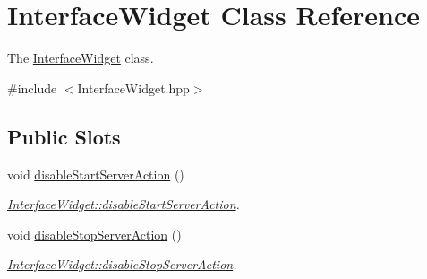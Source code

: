 \hypertarget{class_interface_widget}{\section{\-Interface\-Widget \-Class \-Reference}
\label{class_interface_widget}
}


\-The \hyperlink{class_interface_widget}{\-Interface\-Widget} class.  




{\ttfamily \#include $<$\-Interface\-Widget.\-hpp$>$}

\subsection*{\-Public \-Slots}
\begin{DoxyCompactItemize}
\item 
void \hyperlink{class_interface_widget_a6fb283827577dfa71183a2a64fff7480}{disable\-Start\-Server\-Action} ()
\begin{DoxyCompactList}\small\item\em \hyperlink{class_interface_widget_a6fb283827577dfa71183a2a64fff7480}{\-Interface\-Widget\-::disable\-Start\-Server\-Action}. \end{DoxyCompactList}\item 
void \hyperlink{class_interface_widget_a591b5f123431b60db0bd916214c82cb3}{disable\-Stop\-Server\-Action} ()
\begin{DoxyCompactList}\small\item\em \hyperlink{class_interface_widget_a591b5f123431b60db0bd916214c82cb3}{\-Interface\-Widget\-::disable\-Stop\-Server\-Action}. \end{DoxyCompactList}\end{DoxyCompactItemize}
